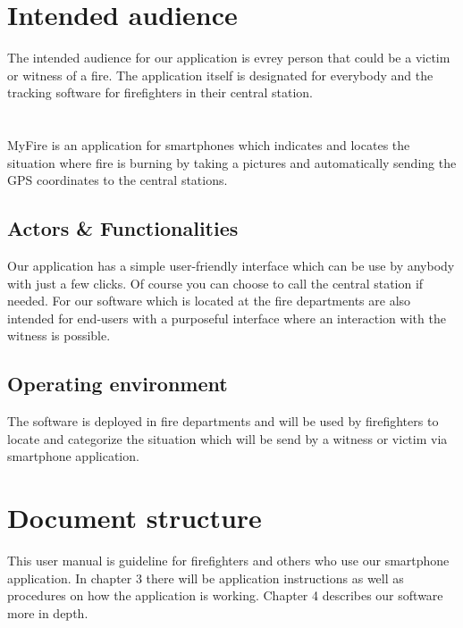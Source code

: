 \section{Intended audience}
The intended audience for our application is evrey person that could be a victim
or witness of a fire. The application itself is designated for everybody and the
tracking software for firefighters in their central station.  

\section{\mysystemname}
MyFire is an application for smartphones which indicates and locates the
situation where fire is burning by taking a pictures and automatically sending
the GPS coordinates to the central stations.


\subsection{Actors \& Functionalities}
Our application has a simple user-friendly interface which can be use by anybody
with just a few clicks. Of course you can choose to call the central station if
needed. For our software which is located at the fire departments are also
intended for end-users with a purposeful interface where an interaction with the
witness is possible.


\subsection{Operating environment}
The software is deployed in fire departments and will be used by firefighters to
locate and categorize the situation which will be send by a witness or victim
via smartphone application.

\section{Document structure}  
This user manual is guideline for firefighters and others who use our smartphone
application. In chapter 3 there will be application instructions as well as
procedures on how the application is working. Chapter 4 describes our software
more in depth.




